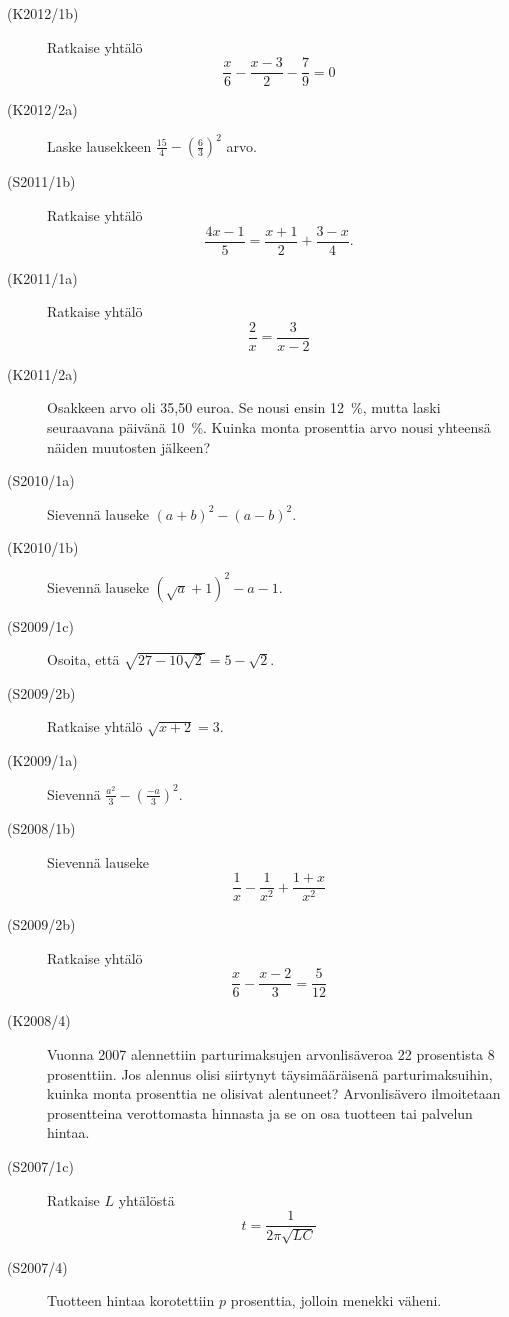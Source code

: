 \begin{description}
    \item[(K2012/1b)]  Ratkaise yhtälö
                        \[\frac{x}{6} - \frac{x-3}{2} - \frac{7}{9} = 0 \]
    \item[(K2012/2a)]  Laske lausekkeen $ \frac{15}{4} - \left( \frac{6}{3} \right)^2 $ arvo.
    \item[(S2011/1b)]  Ratkaise yhtälö
                        \[ \frac{4x - 1}{5} = \frac{x + 1}{2} + \frac{3 - x}{4}. \]
    \item[(K2011/1a)]  Ratkaise yhtälö
                        \[ \frac{2}{x} = \frac{3}{x - 2} \]
    \item[(K2011/2a)]  Osakkeen arvo oli 35,50 euroa. Se nousi ensin 12~\%,
                        mutta laski seuraavana päivänä 10~\%. Kuinka monta prosenttia
                        arvo nousi yhteensä näiden muutosten jälkeen?
    \item[(S2010/1a)]  Sievennä lauseke $ (a + b)^2 - (a - b)^2 $.
    \item[(K2010/1b)]  Sievennä lauseke $ (\sqrt{a} + 1)^2 - a - 1 $.
    \item[(S2009/1c)]  Osoita, että $ \sqrt{27 - 10 \sqrt{ 2} } = 5 - \sqrt{2} $.
    \item[(S2009/2b)]  Ratkaise yhtälö $ \sqrt{x + 2 } = 3  $.
    \item[(K2009/1a)]  Sievennä $ \frac{a^2}{3} - \left( \frac{-a}{3} \right)^2 $.
    \item[(S2008/1b)]  Sievennä lauseke
                        \[ \frac{1}{x} - \frac{1}{x^2} + \frac{1 + x}{x^2} \]
    \item[(S2009/2b)]  Ratkaise yhtälö
                        \[ \frac{x}{6} - \frac{x - 2}{3} = \frac{5}{12} \]
    \item[(K2008/4)]   Vuonna 2007 alennettiin parturimaksujen arvonlisäveroa 22
                        prosentista 8 prosenttiin. Jos alennus olisi siirtynyt
                        täysimääräisenä parturimaksuihin, kuinka monta prosenttia
                        ne olisivat alentuneet? Arvonlisävero ilmoitetaan prosentteina
                        verottomasta hinnasta ja se on osa tuotteen tai palvelun hintaa.
    \item[(S2007/1c)]  Ratkaise $L$ yhtälöstä
                        \[ t = \frac{1}{2\pi\sqrt{LC}} \]
    \item[(S2007/4)]   Tuotteen hintaa korotettiin $p$ prosenttia, jolloin menekki väheni.

\end{description}
